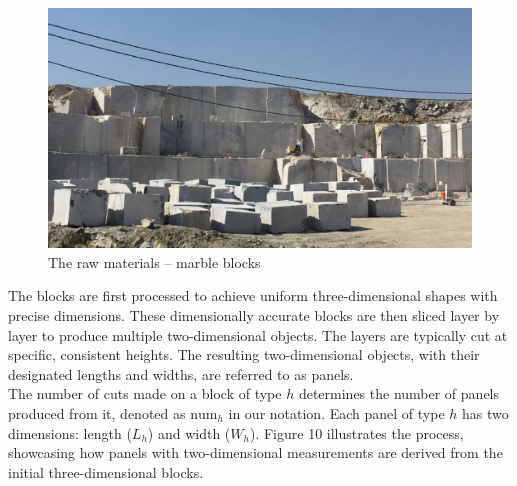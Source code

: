 \documentclass[a4paper]{article}
\begin{document}
    \begin{figure}[h]
        \centering
        \includegraphics[scale = 0.29]{Image/raw_material.jpg}
        \caption{The raw materials – marble blocks }
    \end{figure}

    \pagebreak
    \vspace{0.2cm} \noindent
    The blocks are first processed to achieve uniform three-dimensional shapes with precise dimensions. These dimensionally accurate blocks are then sliced layer by layer to produce multiple two-dimensional objects. The layers are typically cut at specific, consistent heights. The resulting two-dimensional objects, with their designated lengths and widths, are referred to as panels.
    \vspace{0.2cm}\\
    The number of cuts made on a block of type \( h \) determines the number of panels produced from it, denoted as \( \text{num}_h \) in our notation. Each panel of type \( h \) has two dimensions: length (\( L_h \)) and width (\( W_h \)). Figure 10 illustrates the process, showcasing how panels with two-dimensional measurements are derived from the initial three-dimensional blocks.
\end{document}
